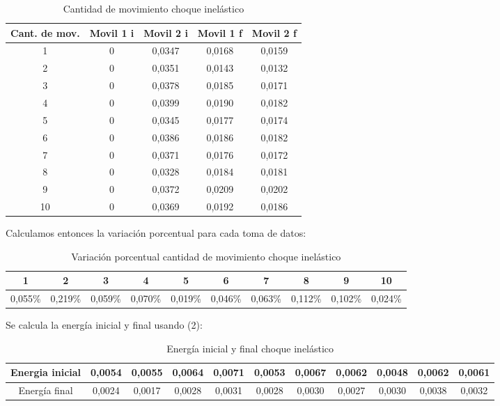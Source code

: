 \documentclass[a4paper]{article}
\begin{document}
\begin{table}[!ht]
    \centering
    \begin{tabular}{|c|c|c|c|c|}
    \hline
        Cant. de mov. & Movil 1 i & Movil 2 i & Movil 1 f & Movil 2 f  \\ \hline
        1 & 0 & 0,0347 & 0,0168 & 0,0159  \\ \hline
        2 & 0 & 0,0351 & 0,0143 & 0,0132  \\ \hline
        3 & 0 & 0,0378 & 0,0185 & 0,0171  \\ \hline
        4 & 0 & 0,0399 & 0,0190 & 0,0182  \\ \hline
        5 & 0 & 0,0345 & 0,0177 & 0,0174  \\ \hline
        6 & 0 & 0,0386 & 0,0186 & 0,0182  \\ \hline
        7 & 0 & 0,0371 & 0,0176 & 0,0172  \\ \hline
        8 & 0 & 0,0328 & 0,0184 & 0,0181  \\ \hline
        9 & 0 & 0,0372 & 0,0209 & 0,0202  \\ \hline
        10 & 0 & 0,0369 & 0,0192 & 0,0186  \\ \hline
    \end{tabular}
    \caption{Cantidad de movimiento choque inelástico}
\end{table}

Calculamos entonces la variación porcentual para cada toma de datos:

\begin{table}[H]
    \centering
    \begin{tabular}{|c|c|c|c|c|c|c|c|c|c|}
    \hline
        1 & 2 & 3 & 4 & 5 & 6 & 7 & 8 & 9 & 10 \\ \hline
        0,055\%  & 0,219\%  & 0,059\%  & 0,070\%  & 0,019\%  & 0,046\%  & 0,063\%  & 0,112\%  & 0,102\%  & 0,024\%  \\ \hline
    \end{tabular}
    \caption{Variación porcentual cantidad de movimiento choque inelástico}
\end{table}

Se calcula la energía inicial y final usando (2):

\begin{table}[!ht]
    \centering
    \begin{tabular}{|c|c|c|c|c|c|c|c|c|c|c|}
    \hline
        Energia inicial & 0,0054 & 0,0055 & 0,0064 & 0,0071 & 0,0053 & 0,0067 & 0,0062 & 0,0048 & 0,0062 & 0,0061 \\ \hline
        Energía final  & 0,0024  & 0,0017  & 0,0028  & 0,0031  & 0,0028  & 0,0030  & 0,0027  & 0,0030  & 0,0038  & 0,0032  \\ \hline
    \end{tabular}
    \caption{Energía inicial y final choque inelástico}
\end{table}
\end{document}
